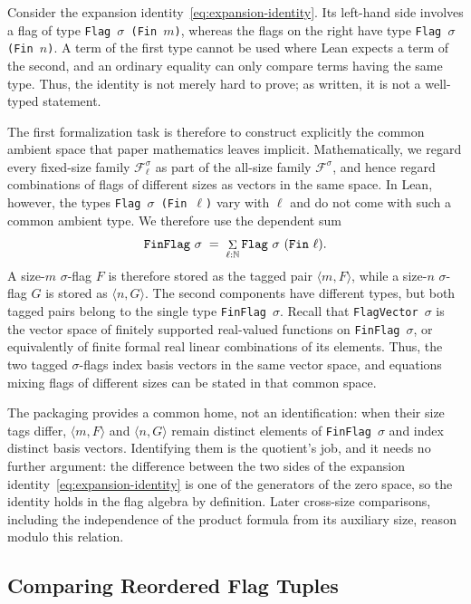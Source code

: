 \documentclass{article}
\newcommand{\lean}[1]{\texttt{#1}}
\begin{document}
Consider the expansion identity~\eqref{eq:expansion-identity}.  Its
left-hand side involves a flag of type \lean{Flag $\sigma$ (Fin $m$)},
whereas the flags on the right have type \lean{Flag $\sigma$ (Fin $n$)}.  A
term of the first type cannot be used where Lean expects a term of the
second, and an ordinary equality can only compare terms having the same
type.  Thus, the identity is not merely hard to prove; as written, it is not
a well-typed statement.

The first formalization task is therefore to construct explicitly
the common ambient space that paper mathematics leaves implicit.
Mathematically, we regard every fixed-size family
$\mathcal{F}^{\sigma}_{\ell}$ as part of the all-size family
$\mathcal{F}^{\sigma}$, and hence regard combinations of flags of different
sizes as vectors in the same space.  In Lean, however, the types
\lean{Flag $\sigma$ (Fin $\ell$)} vary with $\ell$ and do not come with such a
common ambient type.  We therefore use the dependent sum
\[
  \text{\lean{FinFlag}}~\sigma
  \;=\;
  \mathop{\Sigma}_{\ell : \mathbb{N}}
    \text{\lean{Flag}}~\sigma~(\text{\lean{Fin}}~\ell).
\]
A size-$m$ $\sigma$-flag $F$ is therefore stored as the tagged pair
$\langle m,F\rangle$, while a size-$n$ $\sigma$-flag $G$ is stored as
$\langle n,G\rangle$.  The second components have different types, but
both tagged pairs belong to the single type \lean{FinFlag}~$\sigma$.
Recall that \lean{FlagVector}~$\sigma$ is the vector space of finitely
supported real-valued functions on \lean{FinFlag}~$\sigma$, or equivalently
of finite formal real linear combinations of its elements.  Thus, the two
tagged $\sigma$-flags index basis vectors in the same vector space, and
equations mixing flags of different sizes can be stated in that common space.

The packaging provides a common home, not an identification: when their size
tags differ, $\langle m,F\rangle$ and $\langle n,G\rangle$ remain distinct
elements of \lean{FinFlag}~$\sigma$ and index distinct basis vectors.
Identifying them is the quotient's job, and it needs no further argument:
the difference between the two sides of the expansion identity~\eqref{eq:expansion-identity} 
is one of the generators of the zero space, so the identity holds
in the flag algebra by definition.  Later cross-size comparisons, including
the independence of the
product formula from its auxiliary size, reason modulo this relation.

\subsection{Comparing Reordered Flag Tuples}
\label{sec:reordered-flag-tuples}
\end{document}
